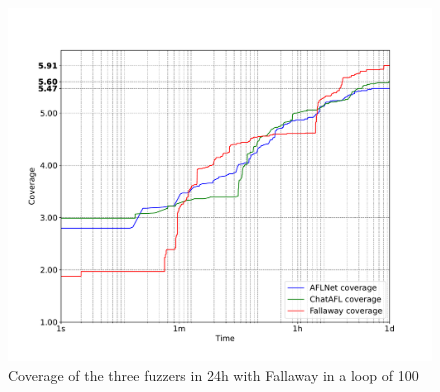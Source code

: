 \begin{figure}[H]
    \centering
    \includegraphics[width=1\textwidth]{Images/coverage_over_time_lighttpd-1day-100l.pdf}
    \caption{Coverage of the three fuzzers in 24h with Fallaway in a loop of 100}
    \label{fig:coverage_1day_100l}
\end{figure}

